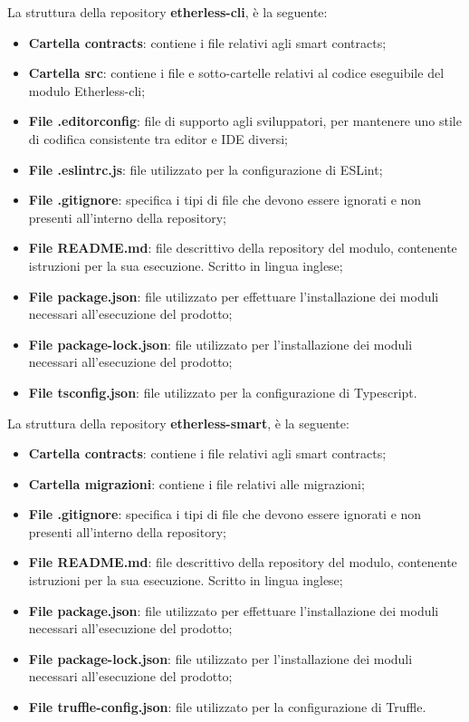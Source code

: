 			La struttura della repository \textbf{etherless-cli}, è la seguente:
			\begin{itemize}
				\item \textbf{Cartella contracts}: contiene i file relativi agli smart contracts;
				\item \textbf{Cartella src}: contiene i file e sotto-cartelle relativi al codice eseguibile del modulo Etherless-cli;
				\item \textbf{File .editorconfig}: file di supporto agli sviluppatori, per mantenere uno stile di codifica consistente tra editor e IDE diversi;
				\item \textbf{File .eslintrc.js}: file utilizzato per la configurazione di ESLint;
				\item \textbf{File .gitignore}: specifica i tipi di file che devono essere ignorati e non presenti all'interno della repository;
				\item \textbf{File README.md}: file descrittivo della repository del modulo, contenente istruzioni per la sua esecuzione. Scritto in lingua inglese;
				\item \textbf{File package.json}: file utilizzato per effettuare l'installazione dei moduli necessari all'esecuzione del prodotto;
				\item \textbf{File package-lock.json}: file utilizzato per l'installazione dei moduli necessari all'esecuzione del prodotto;
				\item \textbf{File tsconfig.json}: file utilizzato per la configurazione di Typescript.
			\end{itemize}
			La struttura della repository \textbf{etherless-smart}, è la seguente:
			\begin{itemize}
				\item \textbf{Cartella contracts}: contiene i file relativi agli smart contracts;
				\item \textbf{Cartella migrazioni}: contiene i file relativi alle migrazioni;
				\item \textbf{File .gitignore}: specifica i tipi di file che devono essere ignorati e non presenti all'interno della repository;
				\item \textbf{File README.md}: file descrittivo della repository del modulo, contenente istruzioni per la sua esecuzione. Scritto in lingua inglese;
				\item \textbf{File package.json}: file utilizzato per effettuare l'installazione dei moduli necessari all'esecuzione del prodotto;
				\item \textbf{File package-lock.json}: file utilizzato per l'installazione dei moduli necessari all'esecuzione del prodotto;
				\item \textbf{File truffle-config.json}: file utilizzato per la configurazione di Truffle.
			\end{itemize}
